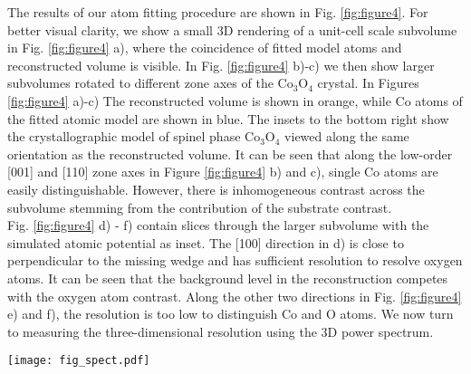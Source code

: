 \documentclass[12pt]{iopart}
\begin{document}
The results of our atom fitting procedure are shown in Fig. \ref{fig:figure4}. For better visual clarity, we show a small 3D rendering of a unit-cell scale subvolume in Fig. \ref{fig:figure4} a), where the coincidence of fitted model atoms and reconstructed volume is visible. In Fig. \ref{fig:figure4} b)-c) we then show larger subvolumes rotated to different zone axes of the $\mathrm{Co_{3}O_{4}}$ crystal. In Figures \ref{fig:figure4} a)-c) The reconstructed volume is shown in orange, while Co atoms of the fitted atomic model are shown in blue. The insets to the bottom right show the crystallographic model of spinel phase $\mathrm{Co_{3}O_{4}}$ viewed along the same orientation as the reconstructed volume. It can be seen that along the low-order [001] and [110] zone axes in Figure \ref{fig:figure4} b) and c), single Co atoms are easily distinguishable. However, there is inhomogeneous contrast across the subvolume stemming from the contribution of the substrate contrast.\\
Fig. \ref{fig:figure4} d) - f) contain slices through the larger subvolume with the simulated atomic potential as inset. The [100] direction in d) is close to perpendicular to the missing wedge and has sufficient resolution to resolve oxygen atoms. It can be seen that the background level in the reconstruction competes with the oxygen atom contrast.
Along the other two directions in Fig. \ref{fig:figure4} e) and f), the resolution is too low to distinguish Co and O atoms. We now turn to measuring the three-dimensional resolution using the 3D power spectrum.\\
\begin{figure*}[ht!]
\texttt{[image: fig\_spect.pdf]}
\caption{\label{fig:figure5} The spectral amplitude of the reconstructed volume, projected (via integration) onto axes X, Y, Z (a) and onto planes XY, XZ, YZ (b, c, d respectively). Axes X and Z are perpendicular to the missing wedge, and Y aligns with the missing wedge direction. Points indicate the highest-resolution peak in the power spectrum. Scale bar in b)-d) \SI{1}{\angstrom^{-1}}}
\end{figure*}
\end{document}
